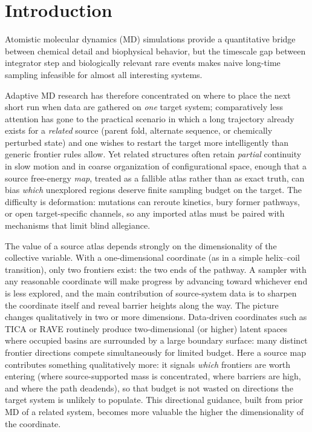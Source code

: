 \chapter{Introduction}

Atomistic molecular dynamics (MD) simulations provide a quantitative bridge between chemical detail and biophysical behavior, but the timescale gap between integrator step and biologically relevant rare events makes naive long-time sampling infeasible for almost all interesting systems.\cite{lindorff2011how,chodera2014markov}

Adaptive MD research has therefore concentrated on where to place the next short run when data are gathered on \emph{one} target system; comparatively less attention has gone to the practical scenario in which a long trajectory already exists for a \emph{related} source (parent fold, alternate sequence, or chemically perturbed state) and one wishes to restart the target more intelligently than generic frontier rules allow.
Yet related structures often retain \emph{partial} continuity in slow motion and in coarse organization of configurational space, enough that a source free-energy \emph{map}, treated as a fallible atlas rather than as exact truth, can bias \emph{which} unexplored regions deserve finite sampling budget on the target.\cite{voelz2013examining,zimmerman2017prediction,pantsar2018assessment}
The difficulty is deformation: mutations can reroute kinetics, bury former pathways, or open target-specific channels, so any imported atlas must be paired with mechanisms that limit blind allegiance.

The value of a source atlas depends strongly on the dimensionality of the collective variable.
With a one-dimensional coordinate (as in a simple helix--coil transition), only two frontiers exist: the two ends of the pathway.
A sampler with any reasonable coordinate will make progress by advancing toward whichever end is less explored, and the main contribution of source-system data is to sharpen the coordinate itself and reveal barrier heights along the way.
The picture changes qualitatively in two or more dimensions.
Data-driven coordinates such as TICA or RAVE routinely produce two-dimensional (or higher) latent spaces where occupied basins are surrounded by a large boundary surface: many distinct frontier directions compete simultaneously for limited budget.
Here a source map contributes something qualitatively more: it signals \emph{which} frontiers are worth entering (where source-supported mass is concentrated, where barriers are high, and where the path deadends), so that budget is not wasted on directions the target system is unlikely to populate.
This directional guidance, built from prior MD of a related system, becomes more valuable the higher the dimensionality of the coordinate.

